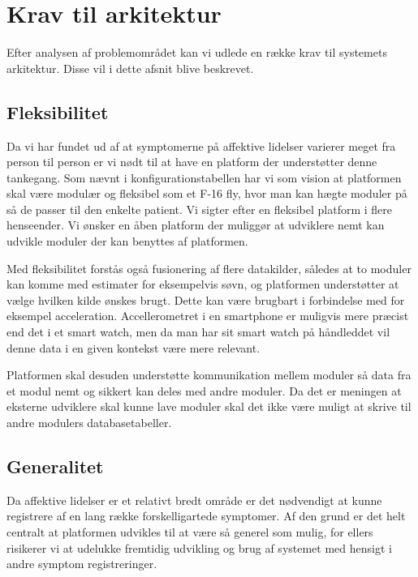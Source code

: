 \section{Krav til arkitektur}\label{arkitekturkrav}
Efter analysen af problemområdet kan vi udlede en række krav til systemets arkitektur. 
Disse vil i dette afsnit blive beskrevet.

\subsection{Fleksibilitet}
Da vi har fundet ud af at symptomerne på affektive lidelser varierer meget fra person til person er vi nødt til at have en platform der understøtter denne tankegang.
Som nævnt i konfigurationstabellen har vi som vision at platformen skal være modulær og fleksibel som et F-16 fly, hvor man kan hægte moduler på så de passer til den enkelte patient.
Vi sigter efter en fleksibel platform i flere henseender.
Vi ønsker en åben platform der muliggør at udviklere nemt kan udvikle moduler der kan benyttes af platformen.

Med fleksibilitet forstås også fusionering af flere datakilder, således at to moduler kan komme med estimater for eksempelvis søvn, og platformen understøtter at vælge hvilken kilde ønskes brugt.
Dette kan være brugbart i forbindelse med for eksempel acceleration.
Accellerometret i en smartphone er muligvis mere præcist end det i et smart watch, men da man har sit smart watch på håndleddet vil denne data i en given kontekst være mere relevant.

Platformen skal desuden understøtte kommunikation mellem moduler så data fra et modul nemt og sikkert kan deles med andre moduler.
Da det er meningen at eksterne udviklere skal kunne lave moduler skal det ikke være muligt at skrive til andre modulers databasetabeller.

\subsection{Generalitet}
Da affektive lidelser er et relativt bredt område er det nødvendigt at kunne registrere af en lang række forskelligartede symptomer.
Af den grund er det helt centralt at platformen udvikles til at være så generel som mulig, for ellers risikerer vi at udelukke fremtidig udvikling og brug af systemet med hensigt i andre symptom registreringer.

